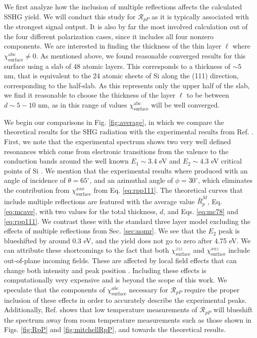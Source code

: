 We first analyze how the inclusion of multiple reflections affects the
calculated SSHG yield. We will conduct this study for $\mathcal{R}_{pP}$ as it is
typically associated with the strongest signal output. It is also by far the
most involved calculation out of the four different polarization cases, since it
includes all four nonzero components. We are interested in finding the thickness
of the thin layer $\ell$ where $\chi^{\mathrm{abc}}_{\mathrm{surface}} \ne 0$.
As mentioned above, we found reasonable converged results for this surface using
a slab of 48 atomic layers. This corresponds to a thickness of $\sim 5$ nm, that
is equivalent to the 24 atomic sheets of Si along the (111) direction,
corresponding to the half-slab. As this represents only the upper half of the
slab, we find it reasonable to choose the thickness of the layer $\ell$ to be
between $d\sim 5-10$ nm, as in this range of values
$\chi^{\mathrm{abc}}_{\mathrm{surface}}$ will be well converged.

We begin our comparisons in Fig. \ref{fig:average}, in which we compare the
theoretical results for the SHG radiation with the experimental results from
Ref. \cite{mejiaPRB02}. First, we note that the experimental spectrum shows two
very well defined resonances which come from electronic transitions from the
valence to the conduction bands around the well known $E_{1}\sim 3.4$ eV and
$E_{2}\sim 4.3$ eV critical points of Si \cite{yubook}. We mention that the
experimental results where produced with an angle of incidence of
$\theta=65^{\circ}$, and an azimuthal angle of $\phi=30^{\circ}$, which eliminates
the contribution from $\chi^{xxx}_{\mathrm{surface}}$ from Eq.
\eqref{eq:rpp111}. The theoretical curves that include multiple reflections are
featured with the average value $\bar{R}^{M}_{p}$, Eq.
\eqref{eq:mcave}, with two values for the total thickness, $d$, and Eqs.
\eqref{eq:mc78} and \eqref{eq:rpp111}. We contrast these with the standard three
layer model excluding the effects of multiple reflections from Sec.
\ref{sec:nomr}. We see that the $E_{2}$ peak is blueshifted by around 0.3 eV,
and the yield does not go to zero after 4.75 eV. We can attribute these
shortcomings to the fact that both $\chi^{zzz}_{\mathrm{surface}}$ and
$\chi^{xxz}_{\mathrm{surface}}$ include out-of-plane incoming fields. These are
affected by local field effects that can change both intensity and peak position
\cite{tancognedejean:tel-01235611}. Including these effects is computationally
very expensive and is beyond the scope of this work. We speculate that the
components of $\chi^{abc}_{\mathrm{surface}}$ necessary for $\mathcal{R}_{pP}$
require the proper inclusion of these effects in order to accurately describe
the experimental peaks. Additionally, Ref. \cite{dadapPRB97} shows that low
temperature measurements of $\mathcal{R}_{pP}$ will blueshift the spectrum away
from room temperature measurements such as those shown in Figs. \ref{fig:RpP}
and \ref{fig:mitchellRpP}, and towards the theoretical results.

